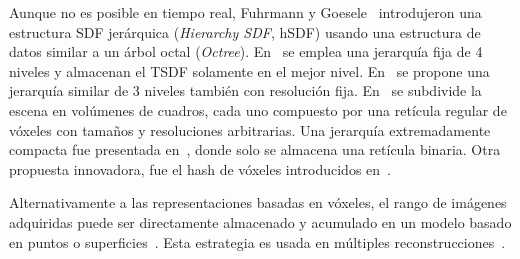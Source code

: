 Aunque no es posible en tiempo real, Fuhrmann y Goesele~\cite{fuhrmann2011fusion} introdujeron una estructura SDF jerárquica (\textit{Hierarchy SDF}, hSDF) usando una estructura de datos similar a un árbol octal (\textit{Octree}). En~\cite{zeng2012memory, zeng2013octree} se emplea una jerarquía fija de 4 niveles y almacenan el TSDF solamente en el mejor nivel. En~\cite{chen2013scalable} se propone una jerarquía similar de 3 niveles también con resolución fija. En~\cite{henry2013patch} se subdivide la escena en volúmenes de cuadros, cada uno compuesto por una retícula regular de vóxeles con tamaños y resoluciones arbitrarias. Una jerarquía extremadamente compacta fue presentada en~\cite{reichl2016memory}, donde solo se almacena una retícula binaria. Otra propuesta innovadora, fue el hash de vóxeles introducidos en~\cite{niessner2013real}.

Alternativamente a las representaciones basadas en vóxeles, el rango de imágenes adquiridas puede ser directamente almacenado y acumulado en un modelo basado en puntos o superficies~\cite{pfister2000surfels}. Esta estrategia es usada en múltiples reconstrucciones~\cite{keller2013real,whelan2015elasticfusion}.


